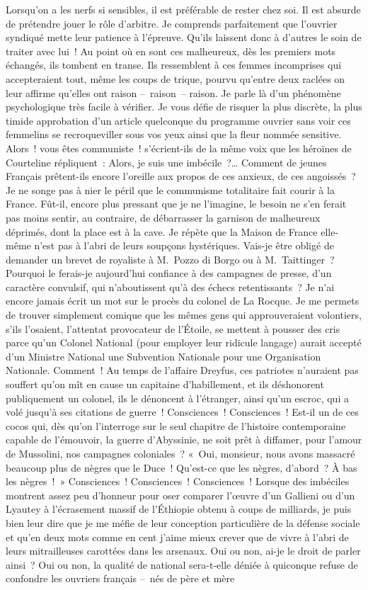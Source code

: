 \documentclass[french,twoside]{book} %
\begin{document}
Lorsqu’on a les nerfs si sensibles, il est préférable de rester chez soi. Il est absurde de prétendre jouer le rôle d’arbitre. Je comprends parfaitement que l’ouvrier syndiqué mette leur patience à l’épreuve. Qu’ils laissent donc à d’autres le soin de traiter avec lui ! Au point où en sont ces malheureux, dès les premiers mots échangés, ils tombent en transe. Ils ressemblent à ces femmes incomprises qui accepteraient tout, même les coups de trique, pourvu qu’entre deux raclées on leur affirme qu’elles ont raison – raison – raison. Je parle là d’un phénomène psychologique très facile à vérifier. Je vous défie de risquer la plus discrète, la plus timide approbation d’un article quelconque du programme ouvrier sans voir ces femmelins se recroqueviller sous vos yeux ainsi que la fleur nommée sensitive. Alors ! vous êtes communiste ! s’écrient-ils de la même voix que les héroïnes de Courteline répliquent : Alors, je suis une imbécile ?… Comment de jeunes Français prêtent-ils encore l’oreille aux propos de ces anxieux, de ces angoissés ? Je ne songe pas à nier le péril que le communisme totalitaire fait courir à la France. Fût-il, encore plus pressant que je ne l’imagine, le besoin ne s’en ferait pas moins sentir, au contraire, de débarrasser la garnison de malheureux déprimés, dont la place est à la cave. Je répète que la Maison de France elle-même n’est pas à l’abri de leurs soupçons hystériques. Vais-je être obligé de demander un brevet de royaliste à M. Pozzo di Borgo ou à M. Taittinger ? Pourquoi le ferais-je aujourd’hui confiance à des campagnes de presse, d’un caractère convulsif, qui n’aboutissent qu’à des échecs retentissants ? Je n’ai encore jamais écrit un mot sur le procès du colonel de La Rocque. Je me permets de trouver simplement comique que les mêmes gens qui approuveraient volontiers, s’ils l’osaient, l’attentat provocateur de l’Étoile, se mettent à pousser des cris parce qu’un Colonel National (pour employer leur ridicule langage) aurait accepté d’un Ministre National une Subvention Nationale pour une Organisation Nationale. Comment ! Au temps de l’affaire Dreyfus, ces patriotes n’auraient pas souffert qu’on mît en cause un capitaine d’habillement, et ils déshonorent publiquement un colonel, ils le dénoncent à l’étranger, ainsi qu’un escroc, qui a volé jusqu’à ses citations de guerre ! Consciences ! Consciences ! Est-il un de ces cocos qui, dès qu’on l’interroge sur le seul chapitre de l’histoire contemporaine capable de l’émouvoir, la guerre d’Abyssinie, ne soit prêt à diffamer, pour l’amour de Mussolini, nos campagnes coloniales ? « Oui, monsieur, nous avons massacré beaucoup plus de nègres que le Duce ! Qu’est-ce que les nègres, d’abord ? À bas les nègres ! » Consciences ! Consciences ! Consciences ! Lorsque des imbéciles montrent assez peu d’honneur pour oser comparer l’œuvre d’un Gallieni ou d’un Lyautey à l’écrasement massif de l’Éthiopie obtenu à coups de milliards, je puis bien leur dire que je me méfie de leur conception particulière de la défense sociale et qu’en deux mots comme en cent j’aime mieux crever que de vivre à l’abri de leurs mitrailleuses carottées dans les arsenaux. Oui ou non, ai-je le droit de parler ainsi ? Oui ou non, la qualité de national sera-t-elle déniée à quiconque refuse de confondre les ouvriers français – nés de père et mère 
\end{document}
